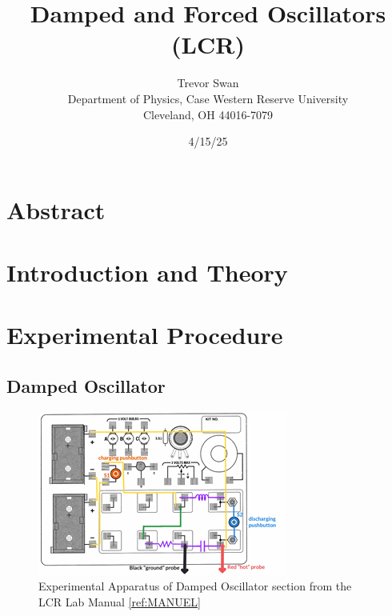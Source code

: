 \documentclass[12pt]{article}
\title{Damped and Forced Oscillators \\ \small (LCR)}
\author{Trevor Swan \\
Department of Physics, Case Western Reserve University \\
Cleveland, OH 44016-7079}
\date{4/15/25}
\begin{document}
\pagestyle{fancy}
\fancyhf{}

\maketitle
\thispagestyle{fancy}
\renewcommand{\headrulewidth}{0pt}

\fancyfoot[C]{\thepage}

\section{Abstract}
\lipsum[1]

\section{Introduction and Theory}
\lipsum[1]

\section{Experimental Procedure}
\subsection{Damped Oscillator}
\lipsum[1]

\begin{figure}
    \centering
    \includegraphics[width=\linewidth]{figures/images/LCR_Apparatus_1.png}
    \caption{Experimental Apparatus of Damped Oscillator section from the LCR Lab Manual \ref{ref:MANUEL}}
    \label{fig:LCR_Apparatus_1}
\end{figure}
\end{document}
